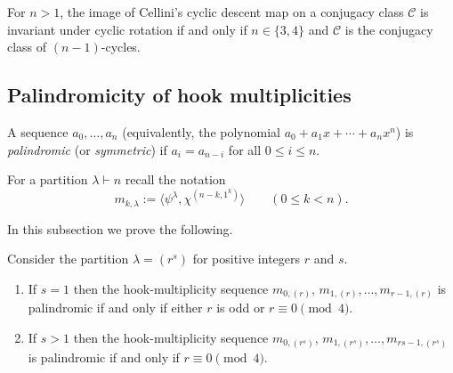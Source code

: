 \documentclass[ALCO,published]{cedram}
\newcommand{\C}{\mathcal C}
\begin{document}
\begin{conjecture} 
    For $n > 1$, the image of Cellini's cyclic descent map on a conjugacy class $\C$ is invariant under cyclic rotation if and only if $n \in \{3,4\}$ and $\C$ is the conjugacy class of $(n-1)$-cycles.
\end{conjecture}


\subsection{Palindromicity of hook multiplicities}
\label{sec:palindrom}	

A sequence $a_0,\ldots,a_n$ (equivalently, the polynomial $a_0+a_1x+\cdots+a_nx^n$) is 	
{\em palindromic} (or {\em symmetric})
if $a_i=a_{n-i}$ for all $0 \le i \le n$. 

For a partition $\lambda\vdash n$ recall the notation
\[
    m_{k,\lambda}
    := \langle \psi^{\lambda},\chi^{(n-k,1^k)} \rangle 
    \qquad (0\le k<n).
\]

In this subsection we prove the following. 

\begin{proposition}\label{conj:r2}
    Consider the partition $\lambda = (r^s)$ for positive integers $r$ and $s$.
    \begin{enumerate}
        \item 
        If $s=1$ then the hook-multiplicity sequence  $m_{0,(r)},\,m_{1,(r)},\ldots, m_{r-1,(r)}$ is palindromic if and only if either $r$ is odd or $r\equiv 0 \pmod 4$. 

        \item
        If $s>1$ then the hook-multiplicity sequence $m_{0,(r^s)},\,m_{1,(r^s)},\ldots, m_{rs-1,(r^s)}$ is palindromic if and only if $r\equiv 0 \pmod 4$.
    \end{enumerate}
\end{proposition}
\end{document}
